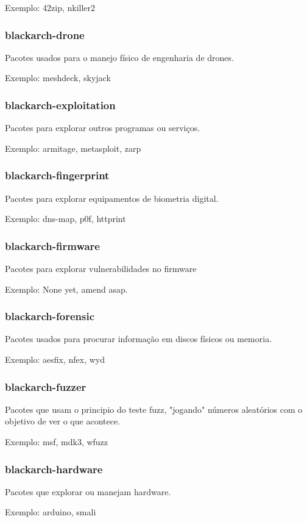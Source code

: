 \documentclass[a4paper, oneside, 11pt]{book}
\begin{document}
Exemplo: 42zip, nkiller2

\subsubsection{blackarch-drone}
Pacotes usados para o manejo físico de engenharia de drones.

Exemplo: meshdeck, skyjack

\subsubsection{blackarch-exploitation}
Pacotes para explorar outros programas ou serviços.

Exemplo: armitage, metasploit, zarp

\subsubsection{blackarch-fingerprint}
Pacotes para explorar equipamentos de biometria digital.

Exemplo: dns-map, p0f, httprint

\subsubsection{blackarch-firmware}
Pacotes para explorar vulnerabilidades no firmware

Exemplo: None yet, amend asap.

\subsubsection{blackarch-forensic}
Pacotes usados para procurar informação em discos físicos ou memoria.

Exemplo: aesfix, nfex, wyd

\subsubsection{blackarch-fuzzer}
Pacotes que usam o principio do teste fuzz, "jogando" números aleatórios com o objetivo de ver o que acontece.

Exemplo: msf, mdk3, wfuzz

\subsubsection{blackarch-hardware}
Pacotes que explorar ou manejam hardware.

Exemplo: arduino, smali
\end{document}
